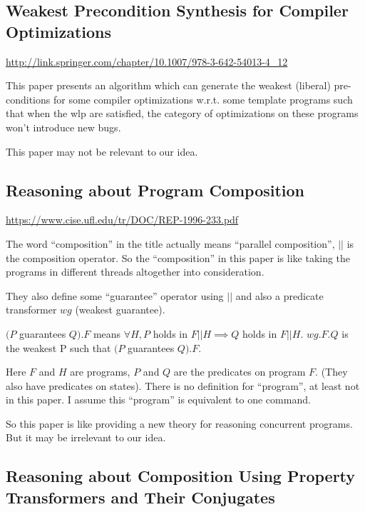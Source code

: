 \documentclass[12pt, fleqn]{article}
\begin{document}
\subsection{Weakest Precondition Synthesis for Compiler Optimizations}

\url{http://link.springer.com/chapter/10.1007/978-3-642-54013-4_12}

\bigskip

This paper presents an algorithm which can generate the weakest
(liberal) pre-conditions for some compiler optimizations w.r.t. some
template programs such that when the wlp are satisfied, the category
of optimizations on these programs won't introduce new bugs.

This paper may not be relevant to our idea.


\subsection{Reasoning about Program Composition}

\url{https://www.cise.ufl.edu/tr/DOC/REP-1996-233.pdf}

\bigskip

The word ``composition'' in the title actually means ``parallel
composition'', $||$ is the composition operator. So the
``composition'' in this paper is like taking the programs in different
threads altogether into consideration.

They also define some ``guarantee'' operator using $||$ and also a
predicate transformer $wg$ (weakest guarantee).

$(P$ guarantees $Q).F$ means $\forall H, P$ holds in $F || H \implies
Q$ holds in $F || H$. $wg.F.Q$ is the weakest P such that $(P$
guarantees $Q).F$.

Here $F$ and $H$ are programs, $P$ and $Q$ are the predicates on
program $F$. (They also have predicates on states). There is no
definition for ``program'', at least not in this paper. I assume this
``program'' is equivalent to one command.

So this paper is like providing a new theory for reasoning concurrent
programs. But it may be irrelevant to our idea.


\subsection{Reasoning about Composition Using Property Transformers and Their Conjugates}
\end{document}
